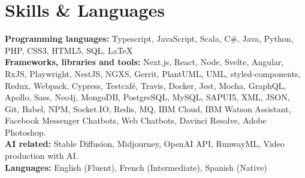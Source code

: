 \documentclass[letterpaper,11pt]{article}
\newcommand{\resumeSubHeadingListStart}{\begin{itemize}[leftmargin=0.15pt, label={}]}
\newcommand{\resumeSubHeadingListEnd}{\end{itemize}}
\begin{document}
\section{Skills \& Languages}
\vspace{2pt}
\resumeSubHeadingListStart
  \small{\item{
      \textbf{Programming languages:}{ Typescript, JavaScript, Scala, C\#, Java, Python, PHP, CSS3, HTML5, SQL, LaTeX} \\ \vspace{3pt}
      \textbf{Frameworks, libraries and tools:}{ Next.js, React, Node, Svelte, Angular, RxJS, Playwright, NestJS, NGXS, Gerrit, PlantUML, UML,
      styled-components, Redux, Webpack, Cypress, Testcafé, Travis, Docker, Jest, Mocha, GraphQL, Apollo, Sass,
      Neo4j, MongoDB, PostgreSQL, MySQL, SAPUI5, XML, JSON, Git, Babel, NPM, Socket.IO, Redis, MQ, IBM Cloud, IBM
      Watson Assistant, Facebook Messenger Chatbots, Web Chatbots, Davinci Resolve, Adobe Photoshop.} \\ \vspace{3pt}
      \textbf{AI related:} {Stable Diffusion, Midjourney, OpenAI API, RunwayML, Video production with AI.} \\ \vspace{3pt}
      \textbf{Languages:}{ English (Fluent), French (Intermediate), Spanish (Native)}
      
  }}
\resumeSubHeadingListEnd
\end{document}
